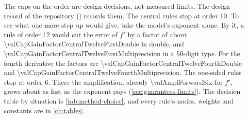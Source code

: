 The caps on the order are design decisions, not measured limits. The design record of the repository
() records them. The central rules stop at order 10. To see what one more step up would
give, take the model's exponent alone. By it, a rule of order 12 would cut the error of $f'$ by a factor of about
\num{\valCapGainFactorCentralTwelveFirstDouble} in double, and \num{\valCapGainFactorCentralTwelveFirstMultiprecision}
in a 50-digit type. For the fourth derivative the factors are \num{\valCapGainFactorCentralTwelveFourthDouble} and
\num{\valCapGainFactorCentralTwelveFourthMultiprecision}. The one-sided rules stop at
order 6. There the amplification, already \num{\valAmplForwardSix} for $f'$, grows about as fast as the exponent pays
(\cref{sec:guarantees-limits}). The decision table by situation is \cref{tab:method-choice}, and every rule's nodes,
weights and constants are in \cref{ch:tables}.
